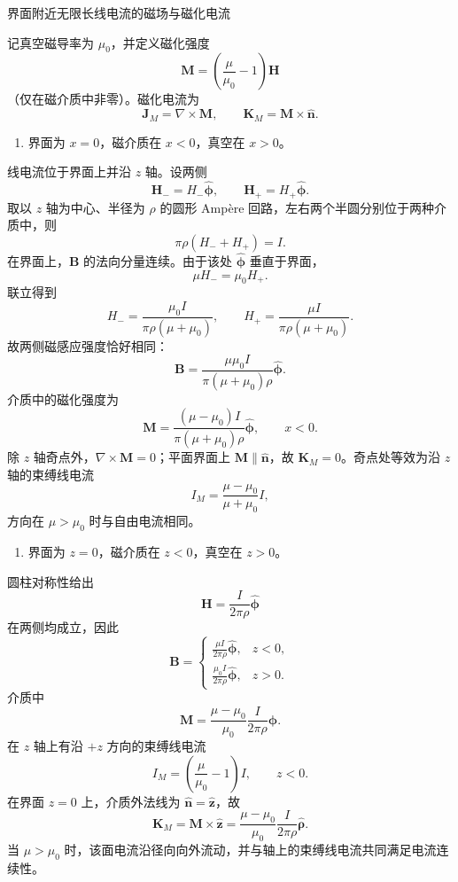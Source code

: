 \begin{question}
界面附近无限长线电流的磁场与磁化电流
\begin{solution}
记真空磁导率为 $\mu_0$，并定义磁化强度
\[
  \mathbf M=\left(\frac{\mu}{\mu_0}-1\right)\mathbf H
\]
（仅在磁介质中非零）。磁化电流为
\[
  \mathbf J_M=\nabla\times\mathbf M,
  \qquad
  \mathbf K_M=\mathbf M\times\hat{\mathbf n}.
\]

\begin{enumerate}
  \item 界面为 $x=0$，磁介质在 $x<0$，真空在 $x>0$。
\end{enumerate}

线电流位于界面上并沿 $z$ 轴。设两侧
\[
  \mathbf H_-=H_-\hat{\boldsymbol\phi},
  \qquad
  \mathbf H_+=H_+\hat{\boldsymbol\phi}.
\]
取以 $z$ 轴为中心、半径为 $\rho$ 的圆形 Amp\`ere 回路，左右两个半圆分别位于两种介质中，则
\[
  \pi\rho(H_-+H_+)=I.
\]
在界面上，$\mathbf B$ 的法向分量连续。由于该处 $\hat{\boldsymbol\phi}$ 垂直于界面，
\[
  \mu H_-=\mu_0H_+.
\]
联立得到
\[
  H_-=\frac{\mu_0I}{\pi\rho(\mu+\mu_0)},
  \qquad
  H_+=\frac{\mu I}{\pi\rho(\mu+\mu_0)}.
\]
故两侧磁感应强度恰好相同：
\[
  \boxed{
  \mathbf B=\frac{\mu\mu_0I}{\pi(\mu+\mu_0)\rho}
  \hat{\boldsymbol\phi}}.
\]
介质中的磁化强度为
\[
  \mathbf M=\frac{(\mu-\mu_0)I}{\pi(\mu+\mu_0)\rho}
  \hat{\boldsymbol\phi},
  \qquad x<0.
\]
除 $z$ 轴奇点外，$\nabla\times\mathbf M=0$；平面界面上 $\mathbf M\parallel\hat{\mathbf n}$，故 $\mathbf K_M=0$。奇点处等效为沿 $z$ 轴的束缚线电流
\[
  \boxed{I_M=\frac{\mu-\mu_0}{\mu+\mu_0}I},
\]
方向在 $\mu>\mu_0$ 时与自由电流相同。

\begin{enumerate}
  \item 界面为 $z=0$，磁介质在 $z<0$，真空在 $z>0$。
\end{enumerate}

圆柱对称性给出
\[
  \mathbf H=\frac{I}{2\pi\rho}\hat{\boldsymbol\phi}
\]
在两侧均成立，因此
\[
  \boxed{
  \mathbf B=
  \begin{cases}
  \displaystyle \frac{\mu I}{2\pi\rho}\hat{\boldsymbol\phi},&z<0,\\[0.7em]
  \displaystyle \frac{\mu_0 I}{2\pi\rho}\hat{\boldsymbol\phi},&z>0.
  \end{cases}}
\]
介质中
\[
  \mathbf M=\frac{\mu-\mu_0}{\mu_0}\frac{I}{2\pi\rho}
  \hat{\boldsymbol\phi}.
\]
在 $z$ 轴上有沿 $+z$ 方向的束缚线电流
\[
  \boxed{I_M=\left(\frac{\mu}{\mu_0}-1\right)I},
  \qquad z<0.
\]
在界面 $z=0$ 上，介质外法线为 $\hat{\mathbf n}=\hat{\mathbf z}$，故
\[
  \boxed{
  \mathbf K_M=\mathbf M\times\hat{\mathbf z}
  =\frac{\mu-\mu_0}{\mu_0}\frac{I}{2\pi\rho}
  \hat{\boldsymbol\rho}}.
\]
当 $\mu>\mu_0$ 时，该面电流沿径向向外流动，并与轴上的束缚线电流共同满足电流连续性。
\end{solution}
\end{question}

